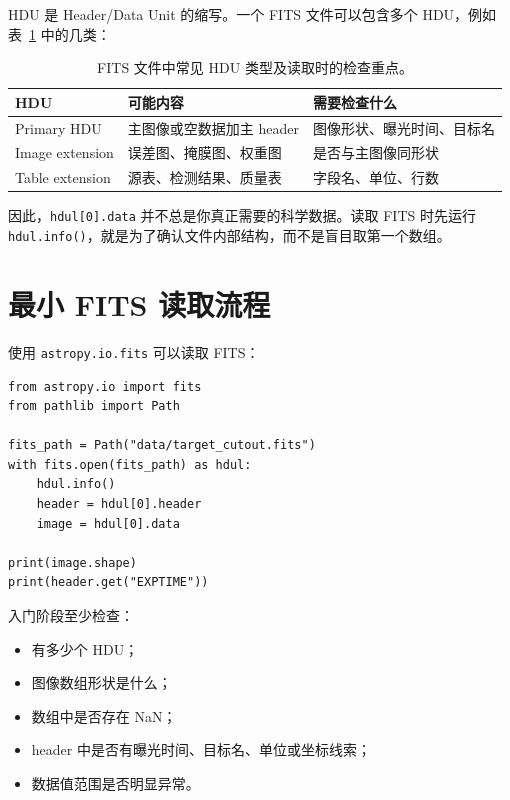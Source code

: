 HDU 是 Header/Data Unit 的缩写。一个 FITS 文件可以包含多个 HDU，例如表~\ref{tab:ch06_fits_hdu_checks} 中的几类：

\begin{table}[htbp]
\centering
\begin{tabular}{p{}p{}p{}}
\toprule
HDU & 可能内容 & 需要检查什么 \\
\midrule
Primary HDU & 主图像或空数据加主 header & 图像形状、曝光时间、目标名 \\
Image extension & 误差图、掩膜图、权重图 & 是否与主图像同形状 \\
Table extension & 源表、检测结果、质量表 & 字段名、单位、行数 \\
\bottomrule
\end{tabular}
\caption{FITS 文件中常见 HDU 类型及读取时的检查重点。}
\label{tab:ch06_fits_hdu_checks}
\end{table}

因此，\texttt{hdul[0].data} 并不总是你真正需要的科学数据。读取 FITS 时先运行 \texttt{hdul.info()}，就是为了确认文件内部结构，而不是盲目取第一个数组。

\section{最小 FITS 读取流程}

使用 \texttt{astropy.io.fits} 可以读取 FITS：

\begin{examplebox}
\begin{lstlisting}[style=pythonstyle]
from astropy.io import fits
from pathlib import Path

fits_path = Path("data/target_cutout.fits")
with fits.open(fits_path) as hdul:
    hdul.info()
    header = hdul[0].header
    image = hdul[0].data

print(image.shape)
print(header.get("EXPTIME"))
\end{lstlisting}
\end{examplebox}

入门阶段至少检查：

\begin{itemize}
    \item 有多少个 HDU；
    \item 图像数组形状是什么；
    \item 数组中是否存在 NaN；
    \item header 中是否有曝光时间、目标名、单位或坐标线索；
    \item 数据值范围是否明显异常。
\end{itemize}

